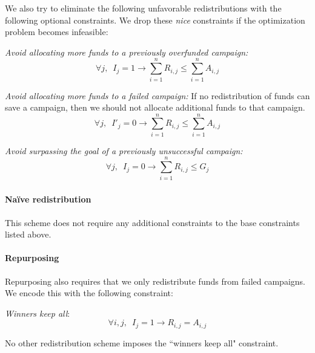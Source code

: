 We also try to eliminate the following unfavorable redistributions with the following optional constraints. We drop these \textit{nice} constraints if the optimization problem becomes infeasible:
\begin{enumerate}[label={[\bf\sc{Nice\arabic*}]},wide =1em]
    \item \textit{Avoid allocating more funds to a previously overfunded campaign:}
    \[\forall j, \;\ I_j = 1 \rightarrow \sum_{i=1}^n R_{i, j} \leq \sum_{i=1}^n A_{i, j}\]
    
    \item \textit{Avoid allocating more funds to a failed campaign:} If no redistribution of funds can save a campaign, then we should not allocate additional funds to that campaign. 
    \[\forall j, \;\ I'_j = 0 \rightarrow \sum_{i=1}^n R_{i, j} \leq \sum_{i=1}^n A_{i, j}\]
    
    \item \textit{Avoid surpassing the goal of a previously unsuccessful campaign:} 
    \[\forall j, \;\ I_j = 0 \rightarrow  \sum_{i=1}^n R_{i, j} \leq G_j \]
\end{enumerate}


\subsubsection{\Car}

\paragraph{Na\"ive redistribution} 

This scheme does not require any additional constraints to the base constraints listed above.


\paragraph{Repurposing} 

Repurposing also requires that we only redistribute funds from failed campaigns. We encode this with the following constraint:

\begin{enumerate}[label={[\bf\sc{Rep}]},wide =1em]
    \item \textit{Winners keep all}: 
    \[\forall i,j, \;\ I_j = 1 \rightarrow R_{i, j} = A_{i, j} \]
\end{enumerate}

No other redistribution scheme imposes the ``winners keep all" constraint.

